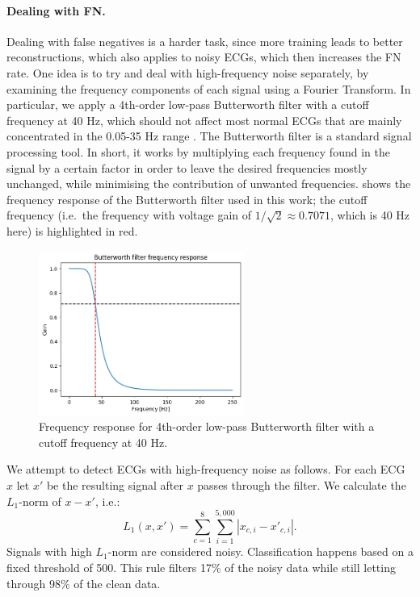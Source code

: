 \documentclass[a4paper,10pt]{article}
\begin{document}
\paragraph{Dealing with FN.} Dealing with false negatives is a harder task, since more training leads to better reconstructions, which also applies to noisy ECGs, which then increases the FN rate. One idea is to try and deal with high-frequency noise separately, by examining the frequency components of each signal using a Fourier Transform. In particular, we apply a 4th-order low-pass Butterworth filter \cite{butterworth} with a cutoff frequency at 40 Hz, which should not affect most normal ECGs that are mainly concentrated in the 0.05-35 Hz range \cite{ecgstats}. The Butterworth filter is a standard signal processing tool. In short, it works by multiplying each frequency found in the signal by a certain factor in order to leave the desired frequencies mostly unchanged, while minimising the contribution of unwanted frequencies.  shows the frequency response of the Butterworth filter used in this work; the cutoff frequency (i.e.\ the frequency with voltage gain of $1\big/\sqrt{2} \approx 0.7071$, which is 40 Hz here) is highlighted in red.
\begin{figure}[htbp]
	\centering
	\includegraphics[width=0.6\textwidth]{butterworth.png}
	\caption{Frequency response for 4th-order low-pass Butterworth filter with a cutoff frequency at 40 Hz.}%
	\label{fig:butterworth_fr}
\end{figure}
We attempt to detect ECGs with high-frequency noise as follows. For each ECG $x$ let $x'$ be the resulting signal after $x$ passes through the filter. We calculate the $L_1$-norm of $x-x'$, i.e.:
\[
	L_1(x, x') = \sum_{c=1}^{8}\sum_{i=1}^{5,000}|x_{c,i} - x'_{c,i}|.
\]
Signals with high $L_1$-norm are considered noisy. Classification happens based on a fixed threshold of 500. This rule filters 17\% of the noisy data while still letting through 98\% of the clean data.
\end{document}
